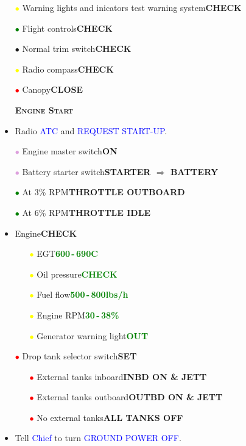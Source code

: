 \documentclass[a4paper,12pt,dvipsnames]{letter}
\newcommand{\radio}[1]{\textcolor{blue}{#1}}
\newcommand{\button}[1]{\textbf{#1}}
\newcommand{\degC}{\textdegree{}C}
\newcommand{\ok}[1]{\textcolor{Green}{\textbf{#1}}}
\newcommand{\myHead}[1]{{\LARGE\textsc{\textbf{#1}}}}
\newcommand{\ri}{\textcolor{Red}{$\bullet$\;}}
\newcommand{\gi}{\textcolor{Green}{$\bullet$\;}}
\newcommand{\yi}{\textcolor{Yellow}{$\bullet$\;}}
\newcommand{\vi}{\textcolor{Plum}{$\bullet$\;}}
\newcommand{\ai}{\textcolor{Apricot}{$\bullet$\;}}
\begin{document}
{\begin{itemize}
\item[\yi] Warning lights and inicators test warning system\dotfill\button{CHECK}
\item[\gi] Flight controls\dotfill\button{CHECK}
\item[\ai] Normal trim switch\dotfill\button{CHECK}
\item[\yi] Radio compass\dotfill\button{CHECK}
\item[\ri] Canopy\dotfill\button{CLOSE}
\end{itemize}
\newpage
\begin{itemize}
\item[] \myHead{Engine Start}
\item Radio \radio{ATC} and \radio{REQUEST START-UP}.
\item[\vi] Engine master switch\dotfill\button{ON}
\item[\vi] Battery starter switch\dotfill\button{STARTER $\Rightarrow$ BATTERY}
\item[\gi] At 3\% RPM\dotfill\button{THROTTLE OUTBOARD}
\item[\gi] At 6\% RPM\dotfill\button{THROTTLE IDLE}
\item Engine\dotfill\button{CHECK}
\begin{itemize}
  \item[\yi] EGT\dotfill\ok{600\,-\,690\degC}
  \item[\yi] Oil pressure\dotfill\ok{CHECK}
  \item[\yi] Fuel flow\dotfill\ok{500\,-\,800\;lbs/h}
  \item[\yi] Engine RPM\dotfill\ok{30\,-\,38\%}
  \item[\yi] Generator warning light\dotfill\ok{OUT}
\end{itemize}
\item[\ri] Drop tank selector switch\dotfill\button{SET}
\begin{itemize}
  \item[\ri] External tanks inboard\dotfill\button{INBD ON \& JETT}
  \item[\ri] External tanks outboard\dotfill\button{OUTBD ON \& JETT}
  \item[\ri] No external tanks\dotfill\button{ALL TANKS OFF}
\end{itemize}
\item Tell \radio{Chief} to turn \radio{GROUND POWER OFF}.

\end{itemize}}
\end{document}
